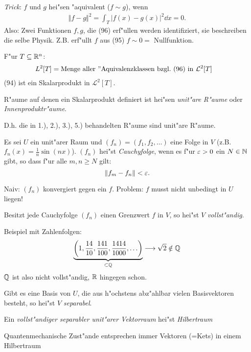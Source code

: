 \documentclass[a4paper]{scrartcl}
\begin{document}
{\emph{Trick}: $f$ und $g$ hei"sen "aquivalent ($f \sim g$), wenn 
\begin{align}
\Vert f - g \Vert^2 = \int_T \vert f(x) - g(x) \vert^2 \dd x = 0.
\end{align}
Also: Zwei Funktionen $f,g$, die (96) erf"ullen werden identifiziert, sie beschreiben die selbe Physik. Z.B. erf"ullt $f$ aus (95) $f \sim 0 = $ Nullfunktion.
\begin{1aufz}
\setcounter{enumi}{4}
\item F"ur $T \subseteq \mathbb{R}^n$:
\begin{align}
L^2[T] & = \mathrm{ Menge \ aller \ "Aquivalenzklassen \ bzgl. \ (96) \ in \ } \mathcal L^2[T]
\end{align}
(94) ist ein Skalarprodukt in $\mathcal L^2[T]$.
\end{1aufz}
R"aume auf denen ein Skalarprodukt definiert ist hei"sen \emph{unit"are R"aume} oder \emph{Innenproduktr"aume}.

D.h. die in 1.), 2.), 3.), 5.) behandelten R"aume sind unit"are R"aume.

Es sei $U$ ein unit"arer Raum und $(f_n) = (f_1, f_2, \ldots)$ eine Folge in $V$ (z.B. $f_n(x) = \frac1n \sin(nx)$). $(f_n)$ hei"st \emph{Cauchyfolge}, wenn es f"ur $\varepsilon > 0$ ein $N \in \mathbb{N}$ gibt, so dass f"ur alle $m,n \geq N$ gilt:
$$\Vert f_m - f_n \Vert < \varepsilon.$$

Naiv: $(f_n)$ konvergiert gegen ein $f$. Problem: $f$ musst nicht unbedingt in $U$ liegen! 

Besitzt jede Cauchyfolge $(f_n)$ einen Grenzwert $f$ in $V$, so hei"st $V$ \emph{vollst"andig}.

Beispiel mit Zahlenfolgen:
$$\underbrace{\left( 1, \frac{14}{10}, \frac{141}{100}, \frac{1414}{1000}, \ldots \right)}_{\subset \mathbb{Q}} \longrightarrow \sqrt 2 \notin \mathbb{Q}$$
$\mathbb{Q}$ ist also nicht vollst"andig, $\mathbb{R}$ hingegen schon.

Gibt es eine Basis von $U$, die aus h"ochstens abz"ahlbar vielen Basisvektoren besteht, so hei"st $V$ \emph{separabel}.

Ein \emph{vollst"andiger separabler unit"arer Vektorraum} hei"st \emph{Hilbertraum}

Quantenmechanische Zust"ande entsprechen immer Vektoren (=Kets) in einem Hilbertraum

}
\end{document}

